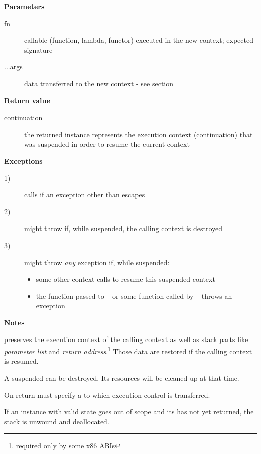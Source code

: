 {\bfseries Parameters}
\begin{description}
    \item[fn]      callable (function, lambda, functor) executed in the new
                   context; expected signature  
    \item[...args] data transferred to the new context - see section
                   \\
\end{description}

{\bfseries Return value}
\begin{description}
    \item[continuation] the returned instance represents the execution context
                        (continuation) that was suspended in order to
                        resume the current context
\end{description}

{\bfseries Exceptions}
\begin{description}
    \item[1)] calls  if an exception other
              than \unwindex escapes \entryfn\ 
    \item[2)] \callcc might throw \unwindex if,
              while suspended, the calling context is destroyed
    \item[3)] \callcc might throw \emph{any} exception if, while
              suspended:
        \begin{itemize}
            \item some other context calls \resumewith to resume
              this suspended context
            \item the function  passed to \resumewith --
              or some function called by  -- throws an exception
        \end{itemize}
\end{description}

{\bfseries Notes}
\begin{description}
\item \callcc preserves the execution context of the calling context as well as stack
parts like \emph{parameter list} and \emph{return address}.\footnote{required
only by some x86 ABIs} Those data are restored if the calling context is resumed.
\item A suspended  can be destroyed. Its resources will be cleaned
up at that time.
\item On return  must specify a \cont to which execution control is
transferred.
\item If an instance with valid state goes out of scope and its  has not yet
returned, the stack is unwound and deallocated.
\end{description}
